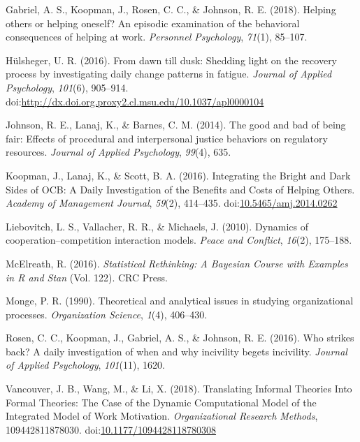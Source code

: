 \documentclass[english,,man]{apa6}
\theoremstyle{definition}
\theoremstyle{definition}
\theoremstyle{definition}
\theoremstyle{remark}
\begin{document}
\leavevmode\hypertarget{ref-gabriel_helping_2018}{}%
Gabriel, A. S., Koopman, J., Rosen, C. C., \& Johnson, R. E. (2018).
Helping others or helping oneself? An episodic examination of the
behavioral consequences of helping at work. \emph{Personnel Psychology},
\emph{71}(1), 85--107.

\leavevmode\hypertarget{ref-hulsheger_dawn_2016}{}%
Hülsheger, U. R. (2016). From dawn till dusk: Shedding light on the
recovery process by investigating daily change patterns in fatigue.
\emph{Journal of Applied Psychology}, \emph{101}(6), 905--914.
doi:\href{https://doi.org/http://dx.doi.org.proxy2.cl.msu.edu/10.1037/apl0000104}{http://dx.doi.org.proxy2.cl.msu.edu/10.1037/apl0000104}

\leavevmode\hypertarget{ref-johnson_good_2014}{}%
Johnson, R. E., Lanaj, K., \& Barnes, C. M. (2014). The good and bad of
being fair: Effects of procedural and interpersonal justice behaviors on
regulatory resources. \emph{Journal of Applied Psychology},
\emph{99}(4), 635.

\leavevmode\hypertarget{ref-koopman_integrating_2016}{}%
Koopman, J., Lanaj, K., \& Scott, B. A. (2016). Integrating the Bright
and Dark Sides of OCB: A Daily Investigation of the Benefits and Costs
of Helping Others. \emph{Academy of Management Journal}, \emph{59}(2),
414--435.
doi:\href{https://doi.org/10.5465/amj.2014.0262}{10.5465/amj.2014.0262}

\leavevmode\hypertarget{ref-liebovitch2010dynamics}{}%
Liebovitch, L. S., Vallacher, R. R., \& Michaels, J. (2010). Dynamics of
cooperation--competition interaction models. \emph{Peace and Conflict},
\emph{16}(2), 175--188.

\leavevmode\hypertarget{ref-mcelreath_statistical_2016}{}%
McElreath, R. (2016). \emph{Statistical Rethinking: A Bayesian Course
with Examples in R and Stan} (Vol. 122). CRC Press.

\leavevmode\hypertarget{ref-monge_theoretical_1990}{}%
Monge, P. R. (1990). Theoretical and analytical issues in studying
organizational processes. \emph{Organization Science}, \emph{1}(4),
406--430.

\leavevmode\hypertarget{ref-rosen_who_2016}{}%
Rosen, C. C., Koopman, J., Gabriel, A. S., \& Johnson, R. E. (2016). Who
strikes back? A daily investigation of when and why incivility begets
incivility. \emph{Journal of Applied Psychology}, \emph{101}(11), 1620.

\leavevmode\hypertarget{ref-vancouver_translating_2018}{}%
Vancouver, J. B., Wang, M., \& Li, X. (2018). Translating Informal
Theories Into Formal Theories: The Case of the Dynamic Computational
Model of the Integrated Model of Work Motivation. \emph{Organizational
Research Methods}, 109442811878030.
doi:\href{https://doi.org/10.1177/1094428118780308}{10.1177/1094428118780308}
\end{document}
